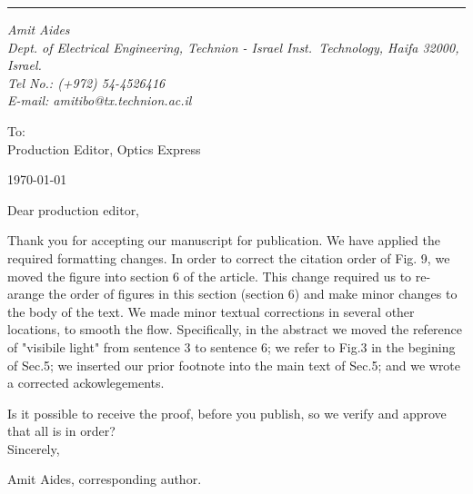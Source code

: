 \documentclass[12pt]{article}
\begin{document}

\vspace*{.5cm} \hrule

\def\sender{
  \it{Amit Aides}\\
  \scriptsize{Dept. of Electrical Engineering, Technion - Israel Inst.~Technology, Haifa 32000, Israel.}\\
  \scriptsize{Tel No.: (+972) 54-4526416}\hspace{5pt}\\
  \scriptsize{E-mail: amitibo@tx.technion.ac.il} } {\sender}

\vspace{0.5cm}
\noindent
To:\\
Production Editor, Optics Express\\[0.6cm]

\begin{flushright}
  \today
\end{flushright}

\vspace{0.3cm} \noindent

Dear production editor,

Thank you for accepting our manuscript for publication.
We have applied the required formatting changes. In order to correct
the citation order of Fig. 9, we moved the figure into section 6 of
the article. This change required us to re-arange the order of figures
in this section (section 6) and make minor changes to the body of 
the text.
We made minor textual corrections in several other locations, to smooth
the flow. Specifically, in the abstract we moved the reference of
"visibile light" from sentence 3 to sentence 6; we refer to Fig.3
in the begining of Sec.5; we inserted our prior footnote into the main text
of Sec.5; and we wrote a corrected ackowlegements.

Is it possible to receive the proof, before you publish, so we
verify and approve that all is in order?\\

\vspace{0.2cm} Sincerely,

\vspace{0.6cm}
Amit Aides, corresponding author.\\
\end{document}
